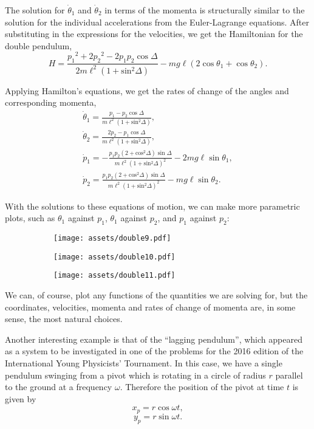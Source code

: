 \documentclass[11pt]{article}
\begin{document}
The solution for $\dot{\theta}_1$ and $\dot{\theta}_2$ in terms of the momenta is structurally similar to the solution for the individual accelerations from the Euler\hyp{}Lagrange equations. After substituting in the expressions for the velocities, we get the Hamiltonian for the double pendulum,
$$H=\frac{p_1{}^2+2p_2{}^2-2p_1p_2\cos\Delta}{2m\ell^2(1+\text{sin}{}^2\Delta)}-mg\ell\left(2\cos\theta_1+\cos\theta_2\right).$$

Applying Hamilton's equations, we get the rates of change of the angles and corresponding momenta,
\begin{gather*}
\dot{\theta}_1=\frac{p_1-p_2\cos\Delta}{m\ell^2(1+\text{sin}{}^2\Delta)},\\[8pt]
\dot{\theta}_2=\frac{2p_2-p_1\cos\Delta}{m\ell^2(1+\text{sin}{}^2\Delta)},\\[8pt]
\dot{p}_1=-\frac{p_1p_2(2+\text{cos}{}^2\Delta)\sin\Delta}{m\ell^2(1+\text{sin}{}^2\Delta)^2}-2mg\ell\sin\theta_1,\\[8pt]
\dot{p}_2=\frac{p_1p_2(2+\text{cos}{}^2\Delta)\sin\Delta}{m\ell^2(1+\text{sin}{}^2\Delta)^2}-mg\ell\sin\theta_2.
\end{gather*}
\newpage

With the solutions to these equations of motion, we can make more parametric plots, such as $\theta_1$ against $p_1$, $\theta_1$ against $p_2$, and $p_1$ against $p_2$:

\begin{figure}[htbp]
\centering
\begin{subfigure}{110pt}
\texttt{[image: assets/double9.pdf]}
\end{subfigure}
\begin{subfigure}{110pt}
\texttt{[image: assets/double10.pdf]}
\end{subfigure}
\begin{subfigure}{110pt}
\texttt{[image: assets/double11.pdf]}
\end{subfigure}
\label{plot:double9}
\end{figure}

We can, of course, plot any functions of the quantities we are solving for, but the coordinates, velocities, momenta and rates of change of momenta are, in some sense, the most natural choices.
\newline

Another interesting example is that of the ``lagging pendulum'', which appeared as a system to be investigated in one of the problems for the 2016 edition of the International Young Physicists' Tournament. In this case, we have a single pendulum swinging from a pivot which is rotating in a circle of radius $r$ parallel to the ground at a frequency $\omega$. Therefore the position of the pivot at time $t$ is given by
$$x_p=r\cos\omega t,$$
$$y_p=r\sin\omega t.$$
\end{document}
